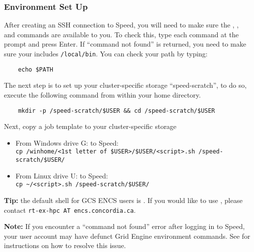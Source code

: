 \subsubsection{Environment Set Up}
\label{sect:envsetup}

After creating an SSH connection to Speed, you will need to make sure the , , and 
commands are available to you. To check this, type each command at the prompt and press Enter.
If ``command not found'' is returned, you need to make sure your  includes \texttt{/local/bin}.
You can check your path by typing:
\begin{verbatim}
    echo $PATH
\end{verbatim}

\noindent The next step is to set up your cluster-specific storage ``speed-scratch'', to do so, execute the following command from within your
home directory.
\begin{verbatim}
    mkdir -p /speed-scratch/$USER && cd /speed-scratch/$USER
\end{verbatim}

\noindent Next, copy a job template to your cluster-specific storage
\begin{itemize}
    \item From Windows drive G: to Speed:\\
    \verb|cp /winhome/<1st letter of $USER>/$USER/<script>.sh /speed-scratch/$USER/|
    \item From Linux drive U: to Speed:\\
    \verb|cp ~/<script>.sh /speed-scratch/$USER/|
\end{itemize}

\noindent \textbf{Tip:} the default shell for GCS ENCS users is .
If you would like to use , please contact \texttt{rt-ex-hpc AT encs.concordia.ca}.

\noindent \textbf{Note:} If you encounter a ``command not found'' error after logging in to Speed,
your user account may have defunct Grid Engine environment commands.
See  for instructions on how to resolve this issue.